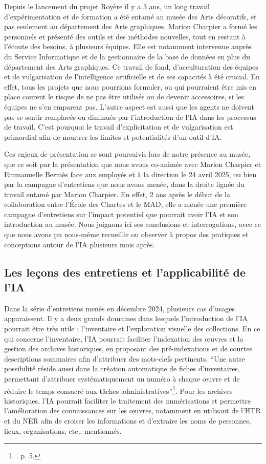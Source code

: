 Depuis le lancement du projet Royère il y a 3 ans, un long travail d'expérimentation et de formation a été entamé au musée des Arts décoratifs, et pas seulement au département des Arts graphiques. Marion Charpier a formé les personnels et présenté des outils et des méthodes nouvelles, tout en restant à l'écoute des besoins, à plusieurs équipes. Elle est notamment intervenue auprès du Service Informatique et de la gestionnaire de la base de données en plus du département des Arts graphiques. Ce travail de fond, d'acculturation des équipes et de vulgarisation de l'intelligence artificielle et de ses capacités à été crucial. En effet, tous les projets que nous pourrions formuler, ou qui pourraient être mis en place courent le risque de ne pas être utilisés ou de devenir accessoires, si les équipes ne s'en emparent pas. L'autre aspect est aussi que les agents ne doivent pas se sentir remplacés ou diminués par l'introduction de l'IA dans les processus de travail. C'est pourquoi le travail d'explicitation et de vulgarisation est primordial afin de montrer les limites et potentialités d'un outil d'IA.

Ces enjeux de présentation se sont poursuivis lors de notre présence au musée, que ce soit par la présentation que nous avons co-animée avec Marion Charpier et Emmanuelle Bermès face aux employés et à la direction le 24 avril 2025, ou bien par la campagne d'entretiens que nous avons menée, dans la droite lignée du travail entamé par Marion Charpier. En effet, 2 ans après le début de la collaboration entre l'École des Chartes et le MAD, elle a menée une première campagne d'entretiens sur l'impact potentiel que pourrait avoir l'IA et son introduction au musée. Nous joignons ici ses conclusions et interrogations, avec ce que nous avons pu nous-même recueillir ou observer à propos des pratiques et conceptions autour de l'IA plusieurs mois après.

\subsection{Les leçons des entretiens et l'applicabilité de l'IA}

Dans la série d'entretiens menés en décembre 2024, plusieurs cas d'usages apparaissent. Il y a deux grands domaines dans lesquels l'introduction de l'IA pourrait être très utile : l'inventaire et l'exploration visuelle des collections. En ce qui concerne l'inventaire, l'IA pourrait faciliter l'indexation des œuvres et la gestion des archives historiques, en proposant des pré-indexations et de courtes descriptions sommaires afin d'attribuer des mots-clefs pertinents. \enquote{Une autre possibilité réside aussi dans la création automatique de fiches d'inventaires, permettant d'attribuer systématiquement un numéro à chaque œuvre et de réduire le temps consacré aux tâches administratives}\footnote{\cite{bermes_repenser_2025}. p. 5.}. Pour les archives historiques, l'IA pourrait faciliter le traitement des numérisations et permettre l'amélioration des connaissances sur les œuvres, notamment en utilisant de l'HTR et du NER afin de croiser les informations et d'extraire les noms de personnes, lieux, organisations, etc,. mentionnés.

